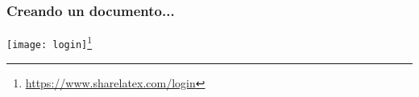 
   


\begin{frame}
   \frametitle{Creando un documento...}
   \texttt{[image: login]}\footnote{\url{https://www.sharelatex.com/login}}
   
\end{frame}

